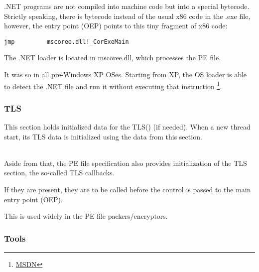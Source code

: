 
.NET programs are not compiled into machine code but into a special bytecode.
Strictly speaking, there is bytecode instead of the usual x86 code
in the .exe file, however, the entry point (\ac{OEP}) points to this tiny fragment of x86 code:

\begin{lstlisting}[style=customasmx86]
jmp         mscoree.dll!_CorExeMain
\end{lstlisting}

The .NET loader is located in mscoree.dll, which processes the PE file.

It was so in all pre-Windows XP \ac{OS}es. Starting from XP, the \ac{OS} loader is able to detect the .NET file
and run it without executing that \JMP instruction
\footnote{\href{http://msdn.microsoft.com/en-us/library/xh0859k0(v=vs.110).aspx}{MSDN}}.

\subsubsection{TLS}

This section holds initialized data for the \ac{TLS}() (if needed).
When a new thread start, its \ac{TLS} data is initialized using the data from this section. \\
\\

Aside from that, the PE file specification also provides initialization of the
\ac{TLS} section, the so-called TLS callbacks.

If they are present, they are to be called before the control is passed to the main entry point (\ac{OEP}).

This is used widely in the PE file packers/encryptors.

\subsubsection{Tools}

\label{ResHack}


